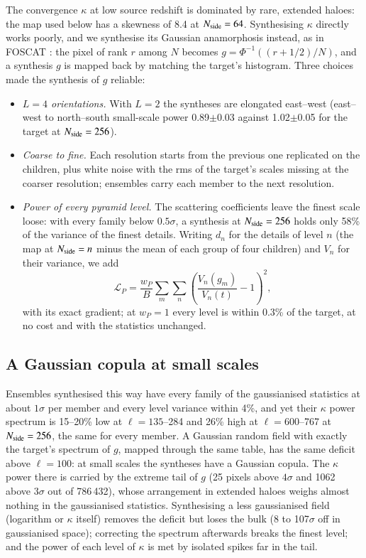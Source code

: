 \documentclass{aa}
\newcommand{\nside}{N_{\rm side}}
\begin{document}
The convergence $\kappa$ at low source redshift is dominated by rare, extended haloes: the map used below has a skewness of 8.4 at $\nside=64$. Synthesising $\kappa$ directly works poorly, and we synthesise its Gaussian anamorphosis instead, as in FOSCAT \citep{foscat}: the pixel of rank $r$ among $N$ becomes $g = \Phi^{-1}((r+1/2)/N)$, and a synthesis $g$ is mapped back by matching the target's histogram. Three choices made the synthesis of $g$ reliable:
\begin{itemize}
\item \emph{$L=4$ orientations.} With $L=2$ the syntheses are elongated east--west (east--west to north--south small-scale power 0.89$\pm$0.03 against 1.02$\pm$0.05 for the target at $\nside=256$).
\item \emph{Coarse to fine.} Each resolution starts from the previous one replicated on the children, plus white noise with the rms of the target's scales missing at the coarser resolution; ensembles carry each member to the next resolution.
\item \emph{Power of every pyramid level.} The scattering coefficients leave the finest scale loose: with every family below $0.5\sigma$, a synthesis at $\nside=256$ holds only 58\% of the variance of the finest details. Writing $d_n$ for the details of level $n$ (the map at $\nside=n$ minus the mean of each group of four children) and $V_n$ for their variance, we add
\begin{equation}
\mathcal{L}_P = \frac{w_P}{B}\sum_m\sum_n\left(\frac{V_n(g_m)}{V_n(t)}-1\right)^2,
\end{equation}
with its exact gradient; at $w_P=1$ every level is within 0.3\% of the target, at no cost and with the statistics unchanged.
\end{itemize}

\subsection{A Gaussian copula at small scales}

Ensembles synthesised this way have every family of the gaussianised statistics at about $1\sigma$ per member and every level variance within 4\%, and yet their $\kappa$ power spectrum is 15--20\% low at $\ell=135$--284 and 26\% high at $\ell=600$--767 at $\nside=256$, the same for every member. A Gaussian random field with exactly the target's spectrum of $g$, mapped through the same table, has the same deficit above $\ell=100$: at small scales the syntheses have a Gaussian copula. The $\kappa$ power there is carried by the extreme tail of $g$ (25 pixels above $4\sigma$ and 1062 above $3\sigma$ out of 786\,432), whose arrangement in extended haloes weighs almost nothing in the gaussianised statistics. Synthesising a less gaussianised field (logarithm or $\kappa$ itself) removes the deficit but loses the bulk (8 to 107$\sigma$ off in gaussianised space); correcting the spectrum afterwards breaks the finest level; and the power of each level of $\kappa$ is met by isolated spikes far in the tail.
\end{document}
